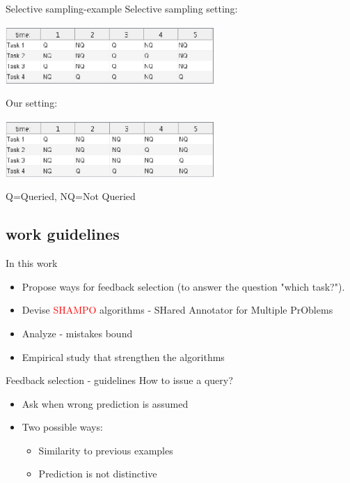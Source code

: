 \documentclass{beamer}
\begin{document}
\begin{frame}{Selective sampling-example}
Selective sampling setting:
\begin{center}
\includegraphics[width=0.6\textwidth]{figs/Table_ss.eps}
\end{center}
Our setting:
\begin{center}
\includegraphics[width=0.6\textwidth]{figs/Table_shampo.eps}
\end{center}
Q=Queried,   NQ=Not Queried
\end{frame}

\subsection{work guidelines}

\begin{frame}{In this work}
\begin{itemize}
\item Propose  ways for feedback selection (to answer the question "which task?").   \newline
\item Devise    \textcolor{red}{SHAMPO} algorithms  - SHared Annotator for Multiple PrOblems\newline
\item Analyze -  mistakes bound \newline
\item Empirical study that strengthen the algorithms\newline
\end{itemize}
\end{frame}


\begin{frame}{Feedback selection - guidelines}
How to issue a query?\newline
\begin{itemize}
\item Ask when  wrong prediction is assumed\newline
\item Two possible ways:\newline
\begin{itemize}
\item Similarity to previous  examples \newline
\item Prediction is not distinctive\end{itemize}
\end{itemize}
\end{frame}
\end{document}
